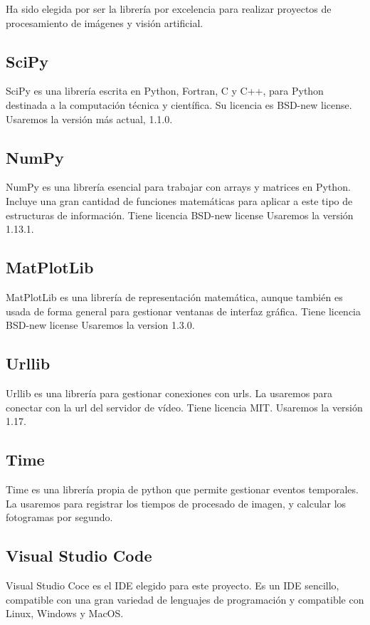 Ha sido elegida por ser la librería por excelencia para realizar proyectos de procesamiento de imágenes y visión artificial.

\subsection{SciPy}
SciPy es una librería escrita en Python, Fortran, C y C++, para Python destinada a la computación técnica y científica. 
Su licencia es BSD-new license.
Usaremos la versión más actual, 1.1.0.

\subsection{NumPy}
NumPy es una librería esencial para trabajar con arrays y matrices en Python. Incluye una gran cantidad de funciones matemáticas para aplicar a este tipo de estructuras de información.
Tiene licencia BSD-new license
Usaremos la versión 1.13.1.

\subsection{MatPlotLib}
MatPlotLib es una librería de representación matemática, aunque también es usada de forma general para gestionar ventanas de interfaz gráfica.
Tiene licencia BSD-new license
Usaremos la version 1.3.0.

\subsection{Urllib}
Urllib es una librería para gestionar conexiones con urls. La usaremos para conectar con la url del servidor de vídeo. 
Tiene licencia MIT.
Usaremos la versión 1.17.

\subsection{Time}
Time es una librería propia de python que permite gestionar eventos temporales. La usaremos para registrar los tiempos de procesado de imagen, y calcular los fotogramas por segundo. 


\subsection{Visual Studio Code}
Visual Studio Coce es el IDE elegido para este proyecto. Es un IDE sencillo, compatible con una gran variedad de lenguajes de programación y compatible con Linux, Windows y MacOS.
 
